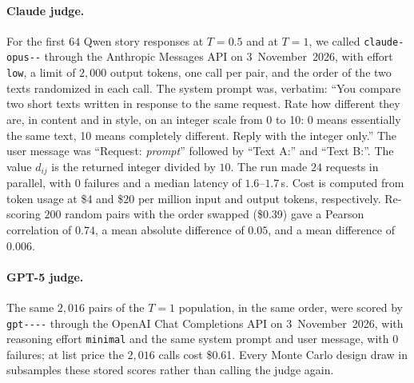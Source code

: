 \paragraph{Claude judge.} For the first $64$ Qwen story responses at
$T=0.5$ and at $T=1$, we called \texttt{claude-\allowbreak opus--} through the
Anthropic Messages API on 3~November~2026, with effort \texttt{low}, a
limit of $2{,}000$ output tokens, one call per pair, and the order of the two texts randomized in each call. The
system prompt was, verbatim: ``You compare two short texts written in
response to the same request. Rate how different they are, in content and
in style, on an integer scale from 0 to 10: 0 means essentially the same
text, 10 means completely different. Reply with the integer only.'' The
user message was ``Request: \textit{prompt}'' followed by ``Text A:'' and
``Text B:''. The value $d_{ij}$ is the returned integer divided by $10$. The run made $24$ requests in parallel, with $0$ failures
and a median latency of $1.6$--$1.7$\,s. Cost is computed from token usage at
\$4 and \$20 per million input and output tokens, respectively. Re-scoring
$200$ random pairs with the order swapped (\$0.39) gave a Pearson correlation of
$0.74$, a mean absolute difference of $0.05$, and a mean difference of
$0.006$.

\paragraph{GPT-5 judge.} The same $2{,}016$ pairs of the $T=1$ population, in
the same order, were scored by \texttt{gpt----} through the OpenAI Chat
Completions API on 3~November~2026, with reasoning effort
\texttt{minimal} and the same system prompt and user message, with $0$
failures; at list price the $2{,}016$ calls cost \$0.61. Every Monte Carlo
design draw in  subsamples these stored scores rather than
calling the judge again.

